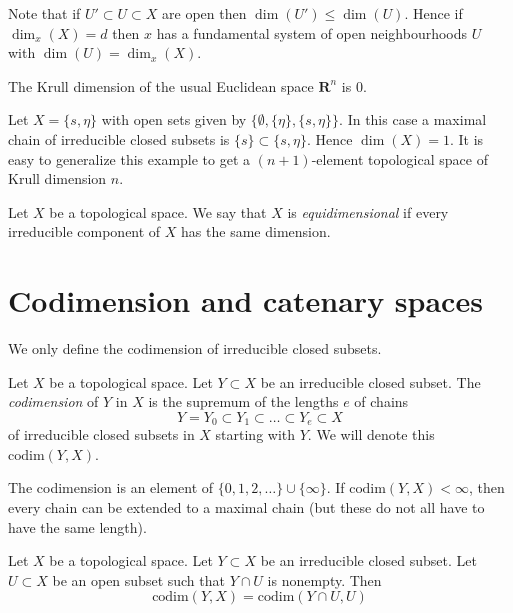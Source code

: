 \noindent
Note that if $U' \subset U \subset X$ are open then
$\dim(U') \leq \dim(U)$. Hence if $\dim_x(X) = d$ then $x$
has a fundamental system of open neighbourhoods $U$ with
$\dim(U) = \dim_x(X)$.

\begin{example}
\label{example-Krull-Rn}
The Krull dimension of the usual Euclidean space
$\mathbf{R}^n$ is $0$.
\end{example}

\begin{example}
\label{example-krull-2set}
Let $X = \{s, \eta\}$ with open sets given
by $\{\emptyset, \{\eta\}, \{s, \eta\}\}$.
In this case a maximal chain of irreducible
closed subsets is $\{s\} \subset \{s, \eta\}$.
Hence $\dim(X) = 1$. It is easy to generalize
this example to get a $(n + 1)$-element topological
space of Krull dimension $n$.
\end{example}

\begin{definition}
\label{definition-equidimensional}
Let $X$ be a topological space.
We say that $X$ is {\it equidimensional} if every irreducible
component of $X$ has the same dimension.
\end{definition}





\section{Codimension and catenary spaces}
\label{section-catenary-spaces}

\noindent
We only define the codimension of irreducible closed subsets.

\begin{definition}
\label{definition-codimension}
Let $X$ be a topological space.
Let $Y \subset X$ be an irreducible closed subset.
The {\it codimension} of $Y$ in $X$ is the supremum of
the lengths $e$ of chains
$$
Y = Y_0 \subset Y_1 \subset \ldots \subset Y_e \subset X
$$
of irreducible closed subsets in $X$ starting with $Y$.
We will denote this $\text{codim}(Y, X)$.
\end{definition}

\noindent
The codimension is an element of $\{0, 1, 2, \ldots\} \cup \{\infty\}$.
If $\text{codim}(Y, X) < \infty$, then every chain can be extended to
a maximal chain (but these do not all have to have the same length).

\begin{lemma}
\label{lemma-codimension-at-generic-point}
Let $X$ be a topological space.
Let $Y \subset X$ be an irreducible closed subset.
Let $U \subset X$ be an open subset such that $Y \cap U$ is nonempty.
Then
$$
\text{codim}(Y, X) = \text{codim}(Y \cap U, U)
$$
\end{lemma}

